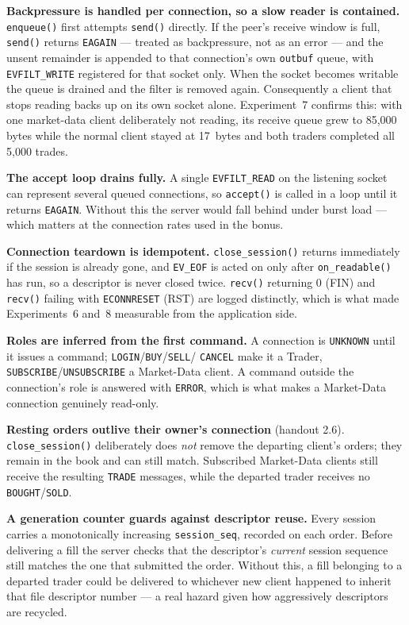 \documentclass[11pt,a4paper]{article}
\newcommand{\cmd}[1]{\texttt{\small #1}}
\begin{document}
\textbf{Backpressure is handled per connection, so a slow reader is contained.}
\cmd{enqueue()} first attempts \cmd{send()} directly. If the peer's receive
window is full, \cmd{send()} returns \cmd{EAGAIN} --- treated as backpressure,
not as an error --- and the unsent remainder is appended to that connection's
own \cmd{outbuf} queue, with \cmd{EVFILT\_WRITE} registered for that socket
only. When the socket becomes writable the queue is drained and the filter is
removed again. Consequently a client that stops reading backs up on its own
socket alone. Experiment~7 confirms this: with one market-data client
deliberately not reading, its receive queue grew to 85{,}000 bytes while the
normal client stayed at 17~bytes and both traders completed all 5{,}000 trades.

\textbf{The accept loop drains fully.} A single \cmd{EVFILT\_READ} on the
listening socket can represent several queued connections, so \cmd{accept()} is
called in a loop until it returns \cmd{EAGAIN}. Without this the server would
fall behind under burst load --- which matters at the connection rates used in
the bonus.

\textbf{Connection teardown is idempotent.} \cmd{close\_session()} returns
immediately if the session is already gone, and \cmd{EV\_EOF} is acted on only
after \cmd{on\_readable()} has run, so a descriptor is never closed twice.
\cmd{recv()} returning 0 (FIN) and \cmd{recv()} failing with \cmd{ECONNRESET}
(RST) are logged distinctly, which is what made Experiments~6 and~8 measurable
from the application side.

\textbf{Roles are inferred from the first command.} A connection is
\cmd{UNKNOWN} until it issues a command; \cmd{LOGIN}/\cmd{BUY}/\cmd{SELL}/%
\cmd{CANCEL} make it a Trader, \cmd{SUBSCRIBE}/\cmd{UNSUBSCRIBE} a Market-Data
client. A command outside the connection's role is answered with \cmd{ERROR},
which is what makes a Market-Data connection genuinely read-only.

\textbf{Resting orders outlive their owner's connection} (handout 2.6).
\cmd{close\_session()} deliberately does \emph{not} remove the departing
client's orders; they remain in the book and can still match. Subscribed
Market-Data clients still receive the resulting \cmd{TRADE} messages, while the
departed trader receives no \cmd{BOUGHT}/\cmd{SOLD}.

\textbf{A generation counter guards against descriptor reuse.} Every session
carries a monotonically increasing \cmd{session\_seq}, recorded on each order.
Before delivering a fill the server checks that the descriptor's \emph{current}
session sequence still matches the one that submitted the order. Without this, a
fill belonging to a departed trader could be delivered to whichever new client
happened to inherit that file descriptor number --- a real hazard given how
aggressively descriptors are recycled.
\end{document}
